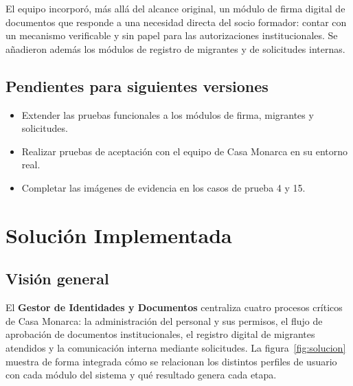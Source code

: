 \documentclass[10pt,letterpaper]{report}
\begin{document}
El equipo incorporó, más allá del alcance original, un módulo de firma digital de documentos que responde a una necesidad directa del socio formador: contar con un mecanismo verificable y sin papel para las autorizaciones institucionales. Se añadieron además los módulos de registro de migrantes y de solicitudes internas.

\section{Pendientes para siguientes versiones}

\begin{itemize}[noitemsep]
  \item Extender las pruebas funcionales a los módulos de firma, migrantes y solicitudes.
  \item Realizar pruebas de aceptación con el equipo de Casa Monarca en su entorno real.
  \item Completar las imágenes de evidencia en los casos de prueba 4 y 15.
\end{itemize}

\chapter{Solución Implementada}

\section{Visión general}

El \textbf{Gestor de Identidades y Documentos} centraliza cuatro procesos críticos de Casa Monarca: la administración del personal y sus permisos, el flujo de aprobación de documentos institucionales, el registro digital de migrantes atendidos y la comunicación interna mediante solicitudes. La figura~\ref{fig:solucion} muestra de forma integrada cómo se relacionan los distintos perfiles de usuario con cada módulo del sistema y qué resultado genera cada etapa.
\end{document}
